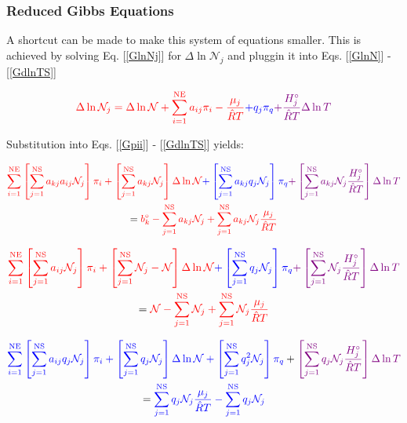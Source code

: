 \documentclass[10pt]{article}
\begin{document}
\begin{flushleft}
\subsubsection{Reduced Gibbs Equations}

A shortcut can be made to make this system of equations smaller. This is achieved by solving Eq. [\ref{GlnNj}] for $\Delta \ln \mathcal{N}_j$ and pluggin it into Eqs. [\ref{GlnN}] - [\ref{GdlnTS}]

\begin{equation}
    \textcolor{red}{ \Delta\ln{\mathcal{N}_j} = \Delta \ln{\mathcal{N}} + \sum_{i=1}^\text{NE} a_{ij} \pi_i -\frac{\mu_j}{\hat{R}T} } \textcolor{blue}{+ q_j \pi_q} \textcolor{violet}{+ \frac{H_j^\circ}{\hat{R}T} \Delta \ln T}
    \label{GdLnNj}
\end{equation}


Substitution into Eqs. [\ref{Gpii}] - [\ref{GdlnTS}] yields:

\begin{multline}
    \textcolor{red}{\sum_{i=1}^\text{NE} \left[ \sum_{j=1}^\text{NS} a_{kj} a_{ij} \mathcal{N}_j \right] \pi_i + \left[ \sum_{j=1}^\text{NS} a_{kj} \mathcal{N}_j \right] \Delta \ln \mathcal{N}} \textcolor{blue}{ + \left[ \sum_{j=1}^\text{NS} a_{kj} q_j \mathcal{N}_j \right] \pi_q} \textcolor{violet}{+ \left[ \sum_{j=1}^\text{NS} a_{kj} \mathcal{N}_j \frac{H_j^\circ}{\hat{R}T} \right] \Delta \ln T}
    \\ = \textcolor{red}{b_k^\circ - \sum_{j=1}^\text{NS} a_{kj} \mathcal{N}_j + \sum_{j=1}^\text{NS} a_{kj} \mathcal{N}_j \frac{\mu_j}{\hat{R}T}}
    \label{GRed1}
\end{multline}

\begin{multline}
    \textcolor{red}{\sum_{i=1}^\text{NE} \left[ \sum_{j=1}^\text{NS} a_{ij} \mathcal{N}_j \right] \pi_i + \left[ \sum_{j=1}^\text{NS} \mathcal{N}_j - \mathcal{N} \right] \Delta \ln \mathcal{N}} \textcolor{blue}{ + \left[ \sum_{j=1}^\text{NS} q_j \mathcal{N}_j \right] \pi_q} \textcolor{violet}{+ \left[ \sum_{j=1}^\text{NS} \mathcal{N}_j \frac{H_j^\circ}{\hat{R}T} \right] \Delta \ln T}
    \\ = \textcolor{red}{\mathcal{N} - \sum_{j=1}^\text{NS} \mathcal{N}_j + \sum_{j=1}^\text{NS} \mathcal{N}_j \frac{\mu_j}{\hat{R}T}}
    \label{GRed}
\end{multline}


\begin{multline}
    \textcolor{blue}{\sum_{i=1}^\text{NE} \left[ \sum_{j=1}^\text{NS} a_{ij} q_j \mathcal{N}_j \right] \pi_i + \left[ \sum_{j=1}^\text{NS} q_j \mathcal{N}_j \right] \Delta \ln \mathcal{N} + \left[ \sum_{j=1}^\text{NS} q_j^2 \mathcal{N}_j \right] \pi_q} + \textcolor{violet}{\left[ \sum_{j=1}^\text{NS} q_j \mathcal{N}_j \frac{H_j^\circ}{\hat{R}T} \right] \Delta \ln T}
    \\ = \textcolor{blue}{\sum_{j=1}^\text{NS} q_j \mathcal{N}_j \frac{\mu_j}{\hat{R}T} - \sum_{j=1}^\text{NS} q_j \mathcal{N}_j}
\end{multline}



\end{flushleft}
\end{document}
